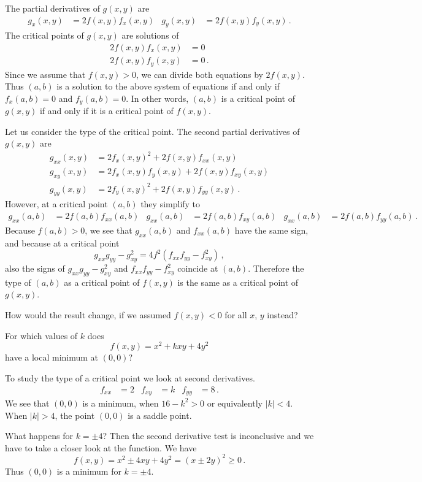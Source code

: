 \begin{solution}
The partial derivatives of $g(x,y)$ are
\begin{align*}
g_x(x,y) &= 2f(x,y)f_x(x,y) &
g_y(x,y) &= 2f(x,y)f_y(x,y) \,.
\end{align*}
The critical points of $g(x,y)$ are solutions of
\begin{align*}
2f(x,y)f_x(x,y) &= 0 \\
2f(x,y)f_y(x,y) &= 0\,.
\end{align*}
Since we assume that $f(x,y) > 0$, we can divide both equations by $2f(x,y)$. Thus $(a,b)$ is a solution to the above system of equations if and only if $f_x(a,b) = 0$ and $f_y(a,b) =0$. In other words, $(a,b)$ is a critical point of $g(x,y)$ if and only if it is a critical point of $f(x,y)$.

Let us consider the type of the critical point. The second partial derivatives of $g(x,y)$ are
\begin{align*}
g_{xx}(x,y) &= 2f_x(x,y)^2 + 2f(x,y)f_{xx}(x,y) \\
g_{xy}(x,y) &= 2f_x(x,y)f_y(x,y) + 2f(x,y)f_{xy}(x,y) \\
g_{yy}(x,y) &= 2f_y(x,y)^2 + 2f(x,y)f_{yy}(x,y)\,.
\end{align*}
However, at a critical point $(a,b)$ they simplify to
\begin{align*}
g_{xx}(a,b) &= 2f(a,b)f_{xx}(a,b) &
g_{xx}(a,b) &= 2f(a,b)f_{xy}(a,b) &
g_{xx}(a,b) &= 2f(a,b)f_{yy}(a,b)\,.
\end{align*}
Because $f(a,b) > 0$, we see that $g_{xx}(a,b)$ and $f_{xx}(a,b)$ have the same sign, and because at a critical point
\[
g_{xx}g_{yy} - g_{xy}^2 = 4f^2 (f_{xx}f_{yy} - f_{xy}^2)\,,
\]
also the signs of $g_{xx}g_{yy} - g_{xy}^2$ and $f_{xx}f_{yy} - f_{xy}^2$ coincide at $(a,b)$. Therefore the type of $(a,b)$ as a critical point of $f(x,y)$ is the same as a critical point of $g(x,y)$.

\begin{note*}
How would the result change, if we assumed $f(x,y) < 0$ for all $x$, $y$ instead?
\end{note*}
\end{solution}

\begin{question}
For which values of $k$ does
\[
f(x,y) = x^2 + kxy + 4y^2
\]
have a local minimum at $(0,0)$?
\end{question}

\begin{solution}
To study the type of a critical point we look at second derivatives.
\begin{align*}
f_{xx} &= 2 &
f_{xy} &= k &
f_{yy} &= 8\,.
\end{align*}
We see that $(0,0)$ is a minimum, when $16-k^2 > 0$ or equivalently $|k| < 4$. When $|k| > 4$, the point $(0,0)$ is a saddle point.

What happens for $k=\pm 4$? Then the second derivative test is inconclusive and we have to take a closer look at the function. We have
\[
f(x,y) = x^2 \pm 4xy + 4y^2 = (x \pm 2y)^2 \geq 0\,.
\]
Thus $(0,0)$ is a minimum for $k =\pm 4$.
\end{solution}

